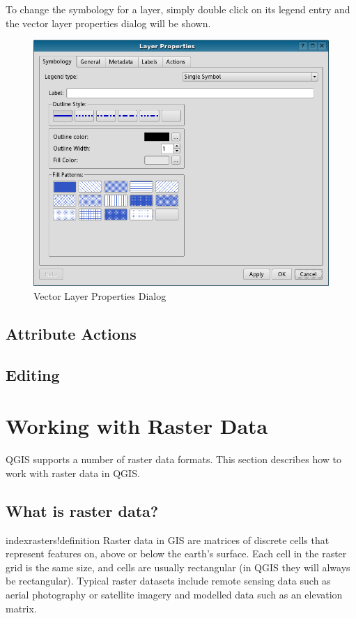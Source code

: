\documentclass[10pt,english]{article}
\begin{document}
\begin{onehalfspace}
To change the symbology for a layer, simply double click on its legend entry and
the vector layer properties dialog will be shown.

\begin{figure}[h]
   \begin{center}
   \caption{Vector Layer Properties Dialog}\label{fig:vector_symbology}\smallskip
   \includegraphics[scale=.5]{qgis_user_guide_images/vectorLayerSymbology}  
\end{center}  
\end{figure}
\subsection{Attribute Actions}
\subsection{Editing}

\clearpage

\section{Working with Raster Data}
QGIS supports a number of raster data formats. This section describes how to work with raster data in QGIS.
\subsection{What is raster data?}
index{rasters!definition}
Raster data in GIS are matrices of discrete cells that represent features on, above or below the earth's surface. Each cell in the raster grid is the same size, and cells are usually rectangular (in QGIS they will always be rectangular). Typical raster datasets include remote sensing data such as aerial photography or satellite imagery and modelled data such as an elevation matrix.\\


\end{onehalfspace}
\end{document}
